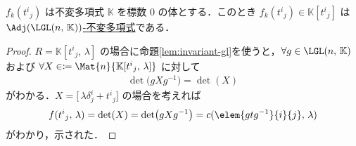 \documentclass[TQFT_main]{subfiles}
\begin{document}
\begin{myprop}[label=prop:det-coeff-invariant]{$f_k(t^i{}_j)$ は不変多項式}
    $\mathbb{K}$ を標数 $0$ の体とする．このとき $f_k (t^i{}_j) \in \mathbb{K}[t^i{}_j]$ は\hyperref[label]{$\Adj(\LGL(n,\, \mathbb{K}))$-不変多項式}である．
\end{myprop}

\begin{proof}
    $R = \mathbb{K}[t^i{}_j,\, \lambda]$ の場合に命題\ref{lem:invariant-gl}を使うと，$\forall g \in \LGL(n,\, \mathbb{K})$ および $\forall X \in  \coloneqq \Mat{n}{\mathbb{K}[t^i{}_j,\, \lambda]}$ に対して
    \begin{align}
        \det \bigl( g X g^{-1}\bigr) = \det(X)
    \end{align}
    がわかる．$X = \bigl[ \, \lambda \delta^i_j + t^i{}_j \bigr]$ の場合を考えれば
    \begin{align}
        f(t^i{}_j,\, \lambda) = \det(X) = \det(gXg^{-1}) = c(\elem{gtg^{-1}}{i}{j},\, \lambda)
    \end{align}
    がわかり，示された．
\end{proof}
\end{document}
